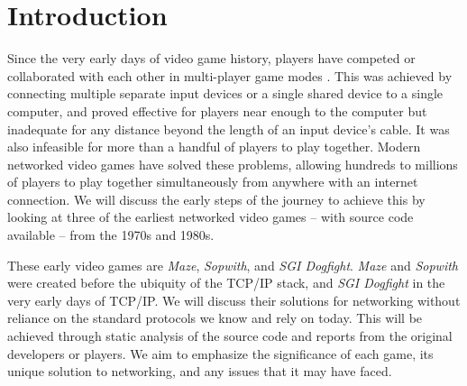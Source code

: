 \section{Introduction}
\label{sec:intro}


Since the very early days of video game history, players have competed or collaborated with each other in multi-player game modes \cite{bnlfirst}. This was achieved by connecting multiple separate input devices or a single shared device to a single computer, and proved effective for players near enough to the computer but inadequate for any distance beyond the length of an input device's cable. It was also infeasible for more than a handful of players to play together. Modern networked video games have solved these problems, allowing hundreds to millions of players to play together simultaneously from anywhere with an internet connection. We will discuss the early steps of the journey to achieve this by looking at three of the earliest networked video games -- with source code available -- from the 1970s and 1980s.

These early video games are \textit{Maze}, \textit{Sopwith}, and \textit{SGI Dogfight}. \textit{Maze} and \textit{Sopwith} were created before the ubiquity of the TCP/IP stack, and \textit{SGI Dogfight} in the very early days of TCP/IP. We will discuss their solutions for networking without reliance on the standard protocols we know and rely on today. This will be achieved through static analysis of the source code and reports from the original developers or players. We aim to emphasize the significance of each game, its unique solution to networking, and any issues that it may have faced.
